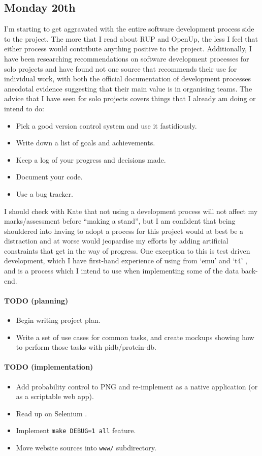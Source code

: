 \subsection{Monday 20th}
I'm starting to get aggravated with the entire software development process side
to the project. The more that I read about RUP and OpenUp, the less I feel that
either process would contribute anything positive to the project. Additionally,
I have been researching recommendations on software development processes for
solo projects and have found not one source that recommends their use for
individual work, with both the official documentation of development processes
anecdotal evidence suggesting that their main value is in organising teams. The
advice that I have seen for solo projects covers things that I already am doing
or intend to do:

\begin{itemize}
\item Pick a good version control system and use it fastidiously.
\item Write down a list of goals and achievements.
\item Keep a log of your progress and decisions made.
\item Document your code.
\item Use a bug tracker.
\end{itemize}

I should check with Kate that not using a development process will not affect my
marks/assessment before ``making a stand'', but I am confident that being
shouldered into having to adopt a process for this project would at best be a
distraction and at worse would jeopardise my efforts by adding artificial
constraints that get in the way of progress. One exception to this is test
driven development, which I have first-hand experience of using from `emu'
\cite{Cummins2013} and `t4' \cite{Cummins2013a}, and is a process which I intend
to use when implementing some of the data back-end.

\paragraph{TODO (planning)}
\begin{itemize}
\item Begin writing project plan.
\item Write a set of use cases for common tasks, and create mockups showing how
  to perform those tasks with pidb/protein-db.
\end{itemize}

\paragraph{TODO (implementation)}
\begin{itemize}
\item Add probability control to PNG and re-implement as a native application
  (or as a scriptable web app).
\item Read up on Selenium \cite{SeleniumND}.
\item Implement \texttt{make DEBUG=1 all} feature.
\item Move website sources into \texttt{www/} subdirectory.
\end{itemize}
